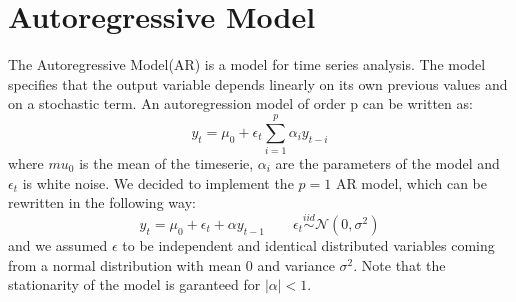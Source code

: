 \chapter{Autoregressive Model}
\label{AR}
The Autoregressive Model(AR) is a model for time series analysis. The model specifies that the output variable depends 
linearly on its own previous values and on a stochastic term. An autoregression model of order p can be written as:
\begin{equation}
    y_{t}=\mu_{0}+\epsilon_t \sum^{p}_{i=1}\alpha_{i} y_{t-i}
\end{equation}
where $mu_{0}$ is the mean of the timeserie, $\alpha_{i}$ are the parameters of the model and $\epsilon_{t}$ is white noise.
We decided to implement the $p=1$ AR model, which can be rewritten in the following way:
\begin{equation}
    \label{AR_q1}
    y_{t}=\mu_{0}+\epsilon_t +\alpha y_{t-1} \qquad 
    \epsilon_t \stackrel{iid}{\sim} \mathcal{N}(0,\sigma^2)
\end{equation}
and we assumed $\epsilon$ to be independent and identical distributed variables coming from a normal distribution with mean $0$ and variance $\sigma^2$.
Note that the stationarity of the model is garanteed for $|\alpha|<1$.

